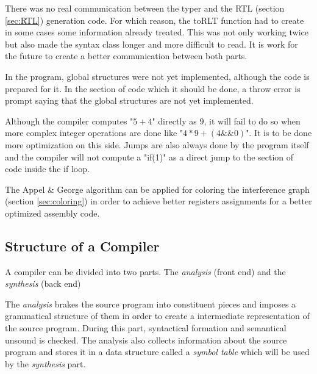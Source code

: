 \documentclass[conference]{IEEEtran}
\theoremstyle{definition}
\begin{document}
There was no real communication between the typer and the RTL (section \ref{sec:RTL}) generation code. For which reason, the toRLT function had to create in some cases some information already treated. This was not only working twice but also made the syntax class longer and more difficult to read. It is work for the future to create a better communication between both parts.

In the program, global structures were not yet implemented, although the code is prepared for it. In the section of code which it should be done, a throw error is prompt saying that the global structures are not yet implemented.

Although the compiler computes "$5 + 4$" directly as $9$, it will fail to do so when more complex integer operations are done like "$4 * 9 + (4 \&\& 0)$". It is to be done more optimization on this side. Jumps are also always done by the program itself and the compiler will not compute a "if(1)" as a direct jump to the section of code inside the if loop.

The Appel \& George algorithm can be applied for coloring the interference graph (section \ref{sec:coloring}) in order to achieve better registers assignments for a better optimized assembly code.



\subsection{Structure of a Compiler}\label{sub_structure_of_a_compiler}

A compiler can be divided into two parts. The \textit{analysis} (front end) and the \textit{synthesis} (back end)

The \textit{analysis} brakes the source program into constituent pieces and imposes a grammatical structure of them in order to create a intermediate representation of the source program. During this part, syntactical formation and semantical unsound is checked. The analysis also collects information about the source program and stores it in a data structure called a \textit{symbol table} which will be used by the \textit{synthesis} part.
\end{document}
